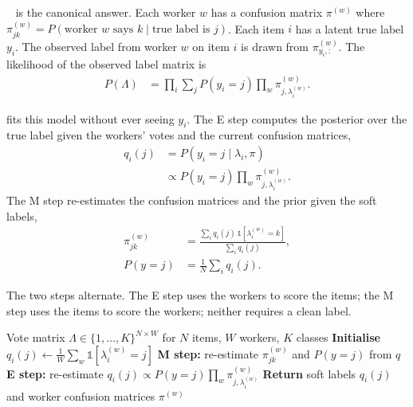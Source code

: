 ~\cite{DawidSkene1979} is the canonical answer. Each worker $w$ has a confusion matrix $\pi^{(w)}$ where $\pi^{(w)}_{jk} = P(\text{worker } w \text{ says } k \mid \text{true label is } j)$. Each item $i$ has a latent true label $y_i$. The observed label from worker $w$ on item $i$ is drawn from $\pi^{(w)}_{y_i, :}$. The likelihood of the observed label matrix is
\begin{align*}
    P(\Lambda) &= \prod_i \sum_{j} P(y_i = j) \prod_w \pi^{(w)}_{j, \lambda^{(w)}_i}.
\end{align*}


 fits this model without ever seeing $y_i$. The E step computes the posterior over the true label given the workers' votes and the current confusion matrices,
\begin{align*}
    q_i(j) &= P(y_i = j \mid \lambda_i, \pi) \\
           &\propto P(y_i = j) \prod_w \pi^{(w)}_{j, \lambda^{(w)}_i}.
\end{align*}
The M step re-estimates the confusion matrices and the prior given the soft labels,
\begin{align*}
    \pi^{(w)}_{jk} &= \frac{\sum_i q_i(j) \, \mathbb{1}[\lambda^{(w)}_i = k]}{\sum_i q_i(j)}, \\
    P(y = j) &= \frac{1}{N} \sum_i q_i(j).
\end{align*}

The two steps alternate. The E step uses the workers to score the items; the M step uses the items to score the workers; neither requires a clean label.

\begin{algorithm}[H]
\caption{Dawid-Skene EM for crowd label aggregation}
\begin{algorithmic}[1]
\Require Vote matrix $\Lambda \in \{1,\ldots,K\}^{N \times W}$ for $N$ items, $W$ workers, $K$ classes
\State \textbf{Initialise} $q_i(j) \gets \frac{1}{W} \sum_w \mathbb{1}[\lambda^{(w)}_i = j]$ 
\Repeat
    \State \textbf{M step:} re-estimate $\pi^{(w)}_{jk}$ and $P(y=j)$ from $q$
    \State \textbf{E step:} re-estimate $q_i(j) \propto P(y=j) \prod_w \pi^{(w)}_{j, \lambda^{(w)}_i}$
\State \textbf{Return} soft labels $q_i(j)$ and worker confusion matrices $\pi^{(w)}$
\end{algorithmic}
\end{algorithm}

